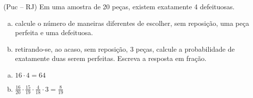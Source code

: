 \begin{ex}
 (Puc – RJ) Em uma amostra de 20 peças, existem exatamente 4 defeituosas.
    \begin{enumerate}[(a)]
    \item calcule o número de maneiras diferentes de escolher, sem reposição, uma peça perfeita e uma defeituosa.
    \item retirando-se, ao acaso, sem reposição, 3 peças, calcule a probabilidade de exatamente duas serem perfeitas. Escreva a resposta em fração.                 
    \end{enumerate}
      \begin{sol}
        \phantom{A}  
          \begin{enumerate}  [(a)]
              \item $16\cdot4=64$
              \item $\frac{16}{20}\cdot\frac{15}{19}\cdot\frac{4}{18}\cdot3=\frac{8}{19}$
          \end{enumerate}
      \end{sol}
\end{ex}